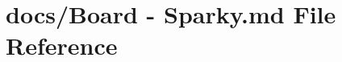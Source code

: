\hypertarget{Board_01-_01Sparky_8md}{\section{docs/\+Board -\/ Sparky.\+md File Reference}
\label{Board_01-_01Sparky_8md}
}
